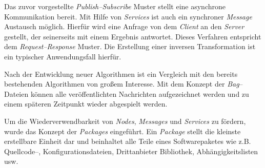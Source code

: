 Das zuvor vorgestellte \textit{Publish--Subscribe} Muster stellt eine asynchrone Kommunikation bereit. Mit Hilfe von \textit{Services} ist auch ein synchroner \textit{Message} Austausch möglich. Hierfür wird eine Anfrage von dem \textit{Client} an den \textit{Server} gestellt, der seinerseits mit einem Ergebnis antwortet. Dieses Verfahren entspricht dem \textit{Request--Response} Muster. Die Erstellung einer inversen Transformation ist ein typischer Anwendungsfall hierfür.

Nach der Entwicklung neuer Algorithmen ist ein Vergleich mit den bereits bestehenden Algorithmen von großem Interesse. Mit dem Konzept der \textit{Bag}--Dateien können alle veröffentlichten Nachrichten aufgezeichnet werden und zu einem späteren Zeitpunkt wieder abgespielt werden.

Um die Wiederverwendbarkeit von \textit{Nodes}, \textit{Messages} und \textit{Services} zu fördern, wurde das Konzept der \textit{Packages} eingeführt. Ein \textit{Package} stellt die kleinste erstellbare Einheit dar und beinhaltet alle Teile eines Softwarepaketes wie z.B. Quellcode--, Konfigurationsdateien, Drittanbieter Bibliothek, Abhängigkeitslisten usw.

